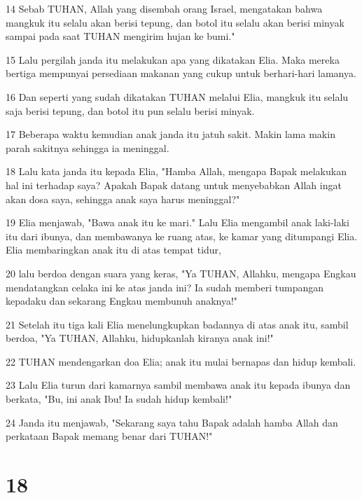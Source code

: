 \par 14 Sebab TUHAN, Allah yang disembah orang Israel, mengatakan bahwa mangkuk itu selalu akan berisi tepung, dan botol itu selalu akan berisi minyak sampai pada saat TUHAN mengirim hujan ke bumi."
\par 15 Lalu pergilah janda itu melakukan apa yang dikatakan Elia. Maka mereka bertiga mempunyai persediaan makanan yang cukup untuk berhari-hari lamanya.
\par 16 Dan seperti yang sudah dikatakan TUHAN melalui Elia, mangkuk itu selalu saja berisi tepung, dan botol itu pun selalu berisi minyak.
\par 17 Beberapa waktu kemudian anak janda itu jatuh sakit. Makin lama makin parah sakitnya sehingga ia meninggal.
\par 18 Lalu kata janda itu kepada Elia, "Hamba Allah, mengapa Bapak melakukan hal ini terhadap saya? Apakah Bapak datang untuk menyebabkan Allah ingat akan dosa saya, sehingga anak saya harus meninggal?"
\par 19 Elia menjawab, "Bawa anak itu ke mari." Lalu Elia mengambil anak laki-laki itu dari ibunya, dan membawanya ke ruang atas, ke kamar yang ditumpangi Elia. Elia membaringkan anak itu di atas tempat tidur,
\par 20 lalu berdoa dengan suara yang keras, "Ya TUHAN, Allahku, mengapa Engkau mendatangkan celaka ini ke atas janda ini? Ia sudah memberi tumpangan kepadaku dan sekarang Engkau membunuh anaknya!"
\par 21 Setelah itu tiga kali Elia menelungkupkan badannya di atas anak itu, sambil berdoa, "Ya TUHAN, Allahku, hidupkanlah kiranya anak ini!"
\par 22 TUHAN mendengarkan doa Elia; anak itu mulai bernapas dan hidup kembali.
\par 23 Lalu Elia turun dari kamarnya sambil membawa anak itu kepada ibunya dan berkata, "Bu, ini anak Ibu! Ia sudah hidup kembali!"
\par 24 Janda itu menjawab, "Sekarang saya tahu Bapak adalah hamba Allah dan perkataan Bapak memang benar dari TUHAN!"

\chapter{18}


